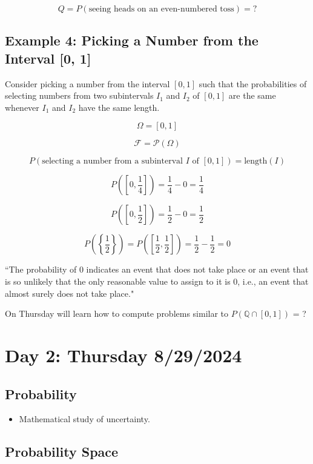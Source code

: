 \documentclass{article}
\begin{document}
\[
Q = P(\text{seeing heads on an even-numbered toss}) = ?
\]

\subsection*{Example 4: Picking a Number from the Interval [0, 1]}
Consider picking a number from the interval \([0, 1]\) such that the probabilities of selecting numbers from two subintervals \(I_1\) and \(I_2\) of \([0, 1]\) are the same whenever \(I_1\) and \(I_2\) have the same length.

\[
\Omega = [0, 1]
\]

\[
\mathcal{F} = \mathcal{P}(\Omega)
\]

\[
P(\text{selecting a number from a subinterval } I \text{ of } [0, 1]) = \text{length}(I)
\]

\[
P([0, \frac{1}{4}]) = \frac{1}{4} - 0 = \frac{1}{4}
\]

\[
P([0, \frac{1}{2}]) = \frac{1}{2} - 0 = \frac{1}{2}
\]

\[
P\left(\left\{\frac{1}{2}\right\}\right) = P\left(\left[\frac{1}{2}, \frac{1}{2}\right]\right) = \frac{1}{2} - \frac{1}{2} = 0
\]

``The probability of 0 indicates an event that does not take place or an event that is so unlikely that the only reasonable value to assign to it is 0, i.e., an event that almost surely does not take place."

On Thursday will learn how to compute problems similar to \(P(\mathbb{Q} \cap [0, 1])\) = ?


\pagebreak

\section*{Day 2: Thursday 8/29/2024}

\subsection*{Probability}

\begin{itemize}
    \item Mathematical study of uncertainty.
\end{itemize}

\subsection*{Probability Space}
\end{document}
